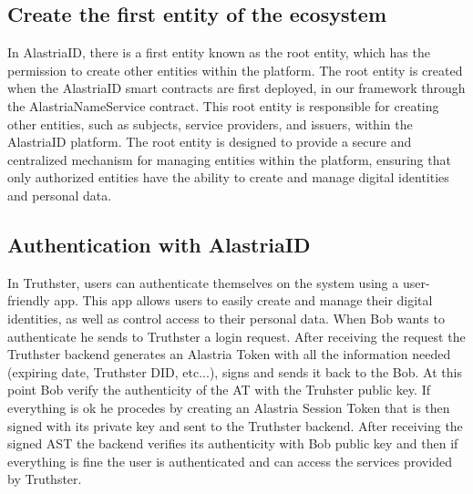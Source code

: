 \documentclass[target=mst,aauheader=]{thud}
\begin{document}
\subsection{Create the first entity of the ecosystem}

In AlastriaID, there is a first entity known as the root entity, which has the permission to create other entities within the platform. The root entity is created when the AlastriaID smart contracts are first deployed, in our framework through the AlastriaNameService contract. This root entity is responsible for creating other entities, such as subjects, service providers, and issuers, within the AlastriaID platform. The root entity is designed to provide a secure and centralized mechanism for managing entities within the platform, ensuring that only authorized entities have the ability to create and manage digital identities and personal data.

\subsection{Authentication with AlastriaID}

In Truthster, users can authenticate themselves on the system using a user-friendly app. This app allows users to easily create and manage their digital identities, as well as control access to their personal data.
When Bob wants to authenticate he sends to Truthster a login request. After receiving the request the Truthster backend generates an Alastria Token with all the information needed (expiring date, Truthster DID, etc...), signs and sends it back to the Bob. At this point Bob verify the authenticity of the AT with the Truhster public key. If everything is ok he procedes by creating an Alastria Session Token that is then signed with its private key and sent to the Truthster backend. After receiving the signed AST the backend verifies its authenticity with Bob public key and then if everything is fine the user is authenticated and can access the services provided by Truthster.
\end{document}
